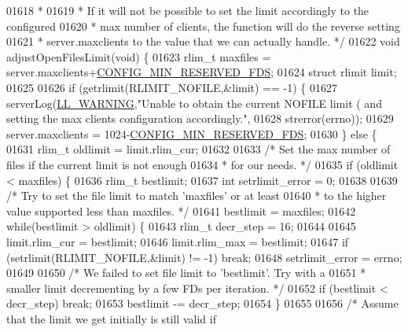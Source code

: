 \begin{DoxyCode}
{{{{{{{{{{{{{{{{01618 \textcolor{comment}{ *}
01619 \textcolor{comment}{ * If it will not be possible to set the limit accordingly to the configured}
01620 \textcolor{comment}{ * max number of clients, the function will do the reverse setting}
01621 \textcolor{comment}{ * server.maxclients to the value that we can actually handle. */}
01622 \textcolor{keywordtype}{void} adjustOpenFilesLimit(\textcolor{keywordtype}{void}) \{
01623     rlim\_t maxfiles = server.maxclients+\hyperlink{server_8h_abcea50457e3de849eab11d0ba5d81d08}{CONFIG\_MIN\_RESERVED\_FDS};
01624     \textcolor{keyword}{struct} rlimit limit;
01625 
01626     \textcolor{keywordflow}{if} (getrlimit(RLIMIT\_NOFILE,&limit) == -1) \{
01627         serverLog(\hyperlink{server_8h_a31229b9334bba7d6be2a72970967a14b}{LL\_WARNING},\textcolor{stringliteral}{"Unable to obtain the current NOFILE limit (%
       and setting the max clients configuration accordingly."},
01628             strerror(errno));
01629         server.maxclients = 1024-\hyperlink{server_8h_abcea50457e3de849eab11d0ba5d81d08}{CONFIG\_MIN\_RESERVED\_FDS};
01630     \} \textcolor{keywordflow}{else} \{
01631         rlim\_t oldlimit = limit.rlim\_cur;
01632 
01633         \textcolor{comment}{/* Set the max number of files if the current limit is not enough}
01634 \textcolor{comment}{         * for our needs. */}
01635         \textcolor{keywordflow}{if} (oldlimit < maxfiles) \{
01636             rlim\_t bestlimit;
01637             \textcolor{keywordtype}{int} setrlimit\_error = 0;
01638 
01639             \textcolor{comment}{/* Try to set the file limit to match 'maxfiles' or at least}
01640 \textcolor{comment}{             * to the higher value supported less than maxfiles. */}
01641             bestlimit = maxfiles;
01642             \textcolor{keywordflow}{while}(bestlimit > oldlimit) \{
01643                 rlim\_t decr\_step = 16;
01644 
01645                 limit.rlim\_cur = bestlimit;
01646                 limit.rlim\_max = bestlimit;
01647                 \textcolor{keywordflow}{if} (setrlimit(RLIMIT\_NOFILE,&limit) != -1) \textcolor{keywordflow}{break};
01648                 setrlimit\_error = errno;
01649 
01650                 \textcolor{comment}{/* We failed to set file limit to 'bestlimit'. Try with a}
01651 \textcolor{comment}{                 * smaller limit decrementing by a few FDs per iteration. */}
01652                 \textcolor{keywordflow}{if} (bestlimit < decr\_step) \textcolor{keywordflow}{break};
01653                 bestlimit -= decr\_step;
01654             \}
01655 
01656             \textcolor{comment}{/* Assume that the limit we get initially is still valid if}
}}}}}}}}}}}}}}}}
\end{DoxyCode}
